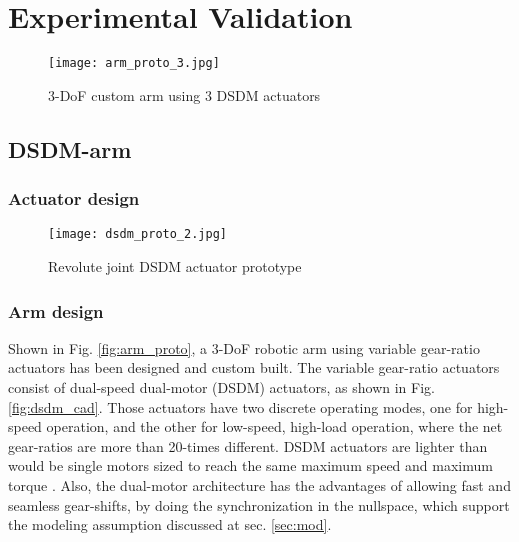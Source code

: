 \chapter{Experimental Validation}
\label{sec:ExperimentalValidation}


\begin{figure}[htp]
	\centering
		\texttt{[image: arm\_proto\_3.jpg]}
	\caption{3-DoF custom arm using 3 DSDM actuators}
	\label{fig:dsdm_arm}
\end{figure}


\section{DSDM-arm}
\label{sec:DSDMArm}

\subsection{Actuator design}
\label{sec:ActuatorDesign}

\begin{figure}[htp]
	\centering
		\texttt{[image: dsdm\_proto\_2.jpg]}
	\caption{Revolute joint DSDM actuator prototype } %
	\label{fig:dsdm_act}
\end{figure}



\subsection{Arm design}
\label{sec:ArmDesign}


Shown in Fig. \ref{fig:arm_proto}, a 3-DoF robotic arm using variable gear-ratio actuators has been designed and custom built. The variable gear-ratio actuators consist of dual-speed dual-motor (DSDM) actuators, as shown in Fig. \ref{fig:dsdm_cad}. Those actuators have two discrete operating modes, one for high-speed operation, and the other for low-speed, high-load operation, where the net gear-ratios are more than 20-times different. DSDM actuators are lighter than would be single motors sized to reach the same maximum speed and maximum torque \cite{girard_two-speed_2015}. Also, the dual-motor architecture has the advantages of allowing fast and seamless gear-shifts, by doing the synchronization in the nullspace, which support the modeling assumption discussed at sec. \ref{sec:mod}. 



